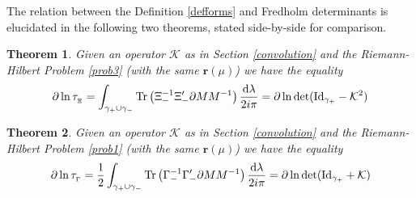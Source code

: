 \documentclass{article}
\newtheorem{theorem}{Theorem}[section]
\def\r{ {\mathbf r}}
\def \K{{\mathcal K}}
\def\d{{\rm d}}
\def \pa{\partial}
\def\Id{\mathrm{Id}}
\def\Tr{\mathop{{\rm Tr}}}
\newcommand{\be}{\begin{eqnarray}}
\newcommand{\ee}{\end{eqnarray}}
\def\le{\left}
\def\ri{\right}
\begin{document}
The relation between the Definition \ref{defforms} and Fredholm determinants is elucidated in the following two theorems, stated side-by-side for comparison.
\begin{shaded}
\begin{theorem}\label{4.1}
Given an operator $\K$ as in Section \ref{convolution} and the Riemann-Hilbert Problem \ref{prob3} (with the same $\r(\mu)$) we have the equality
\be
	\pa \ln\tau_{_\Xi} = \int_{\gamma_+\cup \gamma_-} \Tr \le( \Xi_-^{-1} \Xi_-' \pa M M^{-1}
	\ri) \frac {\d\lambda}{2i\pi}= \pa \ln \det (\Id_{\gamma_+} - \mathcal K^2)
\ee
\end{theorem}
\end{shaded}
%

\begin{shaded}
\begin{theorem}
\label{4.2}
Given an operator $\K$ as in Section \ref{convolution} and the Riemann-Hilbert Problem  \ref{prob1} (with the same $\r(\mu)$) we have the equality
\be
	\pa \ln\tau_{_\Gamma} =\frac 1 2 \int_{\gamma_+\cup \gamma_-} \Tr \le( \Gamma_-^{-1} \Gamma_-' \pa M M^{-1}
	\ri) \frac {\d\lambda}{2i\pi}= \pa \ln \det (\Id_{\gamma_+}
	 +
	 \mathcal K)
\ee
\end{theorem}
\end{shaded}
\end{document}
